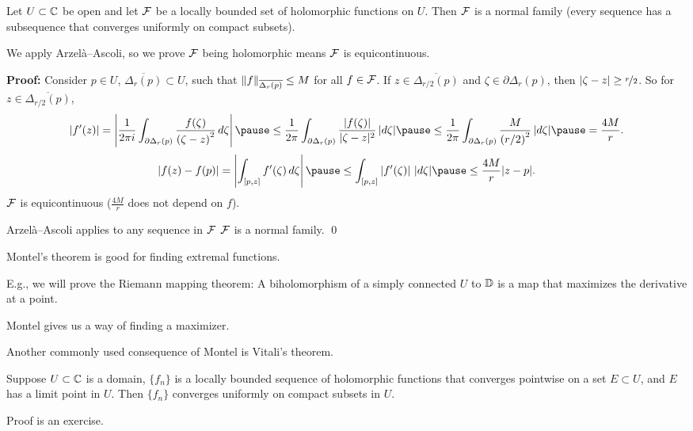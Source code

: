 \documentclass[10pt,aspectratio=169]{beamer}
\begin{document}
\begin{frame}
\begin{theorem}[Montel]
Let $U \subset {\mathbb{C}}$ be open and let ${\mathcal{F}}$
be a locally bounded set of holomorphic functions on $U$.
Then ${\mathcal{F}}$ is a normal family \pause (every sequence has a subsequence that
converges uniformly on compact subsets).
\end{theorem}

\pause
We apply Arzel\`a--Ascoli,
so we prove ${\mathcal{F}}$
being holomorphic means ${\mathcal{F}}$ is equicontinuous.

\medskip

\pause
\textbf{Proof:}
Consider $p \in U$, $\overline{\Delta_r(p)} \subset U$, such that
$\lVert {f} \rVert_{\overline{\Delta_r(p)}} \leq M$ for all $f \in {\mathcal{F}}$.
\pause
If $z \in \overline{\Delta_{r/2}(p)}$ and $\zeta \in \partial \Delta_r(p)$,
then $\lvert {\zeta-z} \rvert \geq \nicefrac{r}{2}$.
\pause
So for $z \in \overline{\Delta_{r/2}(p)}$,
\pause
\[
\abs{f'(z)}
=
\abs{
\frac{1}{2\pi i}
\int_{\partial \Delta_r(p)}
\frac{f(\zeta)}{{(\zeta-z)}^2} \, d\zeta
}
\pause \leq
\frac{1}{2\pi}
\int_{\partial \Delta_r(p)}
\frac{\sabs{f(\zeta)}}{\sabs{\zeta-z}^2} \, \sabs{d\zeta}
\pause \leq
\frac{1}{2\pi}
\int_{\partial \Delta_r(p)}
\frac{M}{{(r/2)}^2} \, \sabs{d\zeta}
\pause =
\frac{4 M}{r}.
\]
\pause
\[
\abs{f(z)-f(p)}
=
\abs{
\int_{[p,z]} f'(\zeta) \, d\zeta
}
\pause
\leq
\int_{[p,z]} \abs{f'(\zeta)} \, \sabs{d\zeta}
\pause
\leq
\frac{4 M}{r} \sabs{z-p} .
\]
\pause
\thus \quad ${\mathcal{F}}$ is equicontinuous ($\frac{4M}{r}$ does not depend on $f$).

\medskip
\pause

\thus \quad
Arzel\`a--Ascoli applies
to any sequence in ${\mathcal{F}}$
\pause
\wthus
${\mathcal{F}}$ is a normal family.
\qed
\end{frame}

\begin{frame}
Montel's theorem is good for finding extremal functions.
\pause

E.g., we will prove the Riemann mapping theorem:
\pause
A biholomorphism of a simply
connected $U$ to ${\mathbb{D}}$ is a map that maximizes the derivative at a point.

\pause
Montel gives us a way of finding a maximizer.

\medskip

\pause

Another commonly used consequence of Montel is Vitali's theorem.

\begin{theorem}[Vitali]
Suppose $U \subset {\mathbb{C}}$ is a domain, $\{ f_n \}$ is a locally bounded
sequence of holomorphic functions
that converges pointwise on a set $E \subset U$,
and $E$ has a limit point in $U$.  Then $\{ f_n \}$
converges uniformly on compact subsets in $U$.
\end{theorem}

\pause
Proof is an exercise.

\end{frame}
\end{document}
